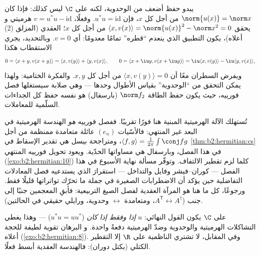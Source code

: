 \begin{example}\label{ex:b2:hermitian:isometry}
يبدو حفظ  أضعف من الوحدوية، لكنه على $\C$
ليس كذلك: فإذا كان $\norm{u(x)} = \norm x$ من أجل كل $x$، فإن $u^*u =
\mathrm{id}$. وفعلًا، $v = u^*u - \mathrm{id}$ هرميتي و
يحقق $\langle x, v(x)\rangle = \norm{u(x)}^2 - \norm x^2 =
0$ من أجل كل $x$؛  العقدي (المزلق (2)
أعلاه)، يكون التطبيق الذي ينعدم ``قطره'' تمامًا معدومًا:
أي $v = 0$. وبالتحديد، يجري الاستقطاب هكذا
\[
0 = \langle x + y, v(x+y)\rangle
= \langle x, v(y)\rangle + \langle y, v(x)\rangle,
\qquad
0 = \langle x + \iu y, v(x + \iu y)\rangle
= \iu\langle x, v(y)\rangle - \iu\langle y, v(x)\rangle ,
\]
ويفرض السطران معًا أن $\langle x, v(y)\rangle = 0$
من أجل كل $x, y$. والفكرة الختامية: ولهذا يمكن التحقق من
``الوحدوية'' بقياس الأطوال وحدها --- وهي صلابة سيستغلها
فصل فورييه، حيث يكون حفظ الطاقة
$\norm f_2$ (بارسفال) هو نفسه حفظ كل الجداءات
السلّمية للمعاملات.
\end{example}

\begin{remark}
تُستهلك الآلة الهرميتية المبنية هنا فورًا
تقريبًا. ففصل فورييه \emph{هو} الهندسة الهرميتية
في البعد غير المنتهي: فالأسّيات $(e_n)$ عائلة
متعامدة ممنظمة من أجل $\langle f, g\rangle =
\frac{1}{2\pi}\int\conj fg$، ومتراجحة بيسل هي
تقدير الإسقاط في \cref{thm:b2:hermitian:cs} في هذا الفصل،
وبارسفال هي مساواتها الحدّية. ويعود تحويل فورييه المنتهي
(\cref{exo:b2:hermitian:10}) كلما لزم تقطير
الالتفاف. وتوفّر مسألة نهاية الأسبوع في هذا الفصل ---
كوران--فيشر وفايل والتداخل --- استقرارَ
 الذي يستدعيه فصل المعادلات التفاضلية
حين يؤكد أن الاضطرابات الصغيرة في جملة ما
تحرّك تواتراتها قليلًا فقط. ورجوعًا، كل ما هنا
هو المرآة العقدية لفصل الصيغ التربيعية: فأبقِ
المعجمين جنبًا إلى جنب ($A^{\mathsf T} \leftrightarrow
A^\dagger$، ومتعامدة $\leftrightarrow$ وحدوية، ورايلي
حقيقي في الحالتين).
\end{remark}

\begin{remark}
على $\C$ يكون القول النهائي: $u$ \emph{
 إذا وفقط إذا كان } ($u^*u = uu^*$) ---
وهذا يغطي التشاكلات الهرميتية والوحدوية وضدّ الهرميتية دفعةً واحدة. و
البرهان تقوية لطيفة للحجة أعلاه
(\cref{exo:b2:hermitian:8}). وفي المقابل، لا تشتري الناظمية على $\R$
إلا التقطير الكتلي (بكتل دوران): فالهندسة العقدية
أبسط فعلًا.
\end{remark}

